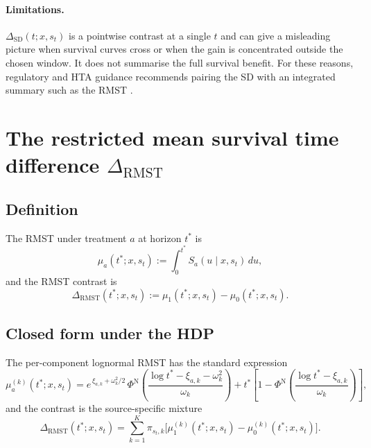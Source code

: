 \documentclass[11pt]{article}
\theoremstyle{plain}
\theoremstyle{definition}
\theoremstyle{remark}
\newcommand{\1}{\mathds{1}}
\newcommand{\Spot}{S}
\newcommand{\RMST}{\mathrm{RMST}}
\newcommand{\SD}{\mathrm{SD}}
\begin{document}
\paragraph{Limitations.} $\Delta_{\SD}(t; x, s_{t})$ is a pointwise contrast
at a single $t$ and can give a misleading picture when survival curves
cross or when the gain is concentrated outside the chosen window. It does
not summarise the full survival benefit. For these reasons, regulatory and
HTA guidance recommends pairing the SD with an integrated summary such as
the RMST \citep{Royston2013}.

\section{The restricted mean survival time difference $\Delta_{\RMST}$}

\subsection{Definition}

The RMST under treatment $a$ at horizon $t^{*}$ is
\begin{equation}
  \mu_{a}(t^{*}; x, s_{t}) := \int_{0}^{t^{*}}\!
  \Spot_{a}(u \mid x, s_{t})\,du,
\end{equation}
and the RMST contrast is
\begin{equation}
  \Delta_{\RMST}(t^{*}; x, s_{t}) := \mu_{1}(t^{*}; x, s_{t}) - \mu_{0}(t^{*}; x, s_{t}).
\end{equation}

\subsection{Closed form under the HDP}

The per-component lognormal RMST has the standard expression
\begin{equation}
  \mu_{a}^{(k)}(t^{*}; x, s_{t})
  = e^{\,\xi_{a, k} + \omega_{k}^{2}/2}\,
    \Phi^{\mathrm{N}}\!\left(\frac{\log t^{*} - \xi_{a, k} - \omega_{k}^{2}}{\omega_{k}}\right)
  + t^{*}\!\left[1 - \Phi^{\mathrm{N}}\!\left(\frac{\log t^{*} - \xi_{a, k}}{\omega_{k}}\right)\right],
\end{equation}
and the contrast is the source-specific mixture
\begin{equation}
  \boxed{\;
    \Delta_{\RMST}(t^{*}; x, s_{t})
    = \sum_{k=1}^{K} \pi_{s_{t}, k}\bigl[
        \mu_{1}^{(k)}(t^{*}; x, s_{t}) - \mu_{0}^{(k)}(t^{*}; x, s_{t})
      \bigr].
  \;}
  \label{eq:RMST-closed}
\end{equation}
\end{document}

